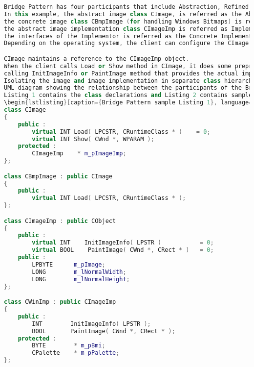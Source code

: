 \documentclass{book}
\begin{document}
\begin{lstlisting}[caption={Bridge Pattern sample code 2},label={lst:bridgepsc2},language=C++]
Bridge Pattern has four participants that include Abstraction, Refined Abstraction, Implementor and Concrete Implementor.
In this example, the abstract image class CImage, is referred as the Abstraction,
the concrete image class CBmpImage (for handling Windows Bitmaps) is referred as Refined Abstraction,
the abstract image implementation class CImageImp is referred as Implementor and the concrete class CWinImp that implements
the interfaces of the Implementor is referred as the Concrete Implementor. The application using the CImage Abstraction is the client.
Depending on the operating system, the client can configure the CImage subclass (Refined Abstraction) with a concrete CImageImp class object (Concrete Implementor).

CImage maintains a reference to the CImageImp object.
When the client calls Load or Show method in CImage, it does some preprocessing and forwards the request to CImageImp object by
calling InitImageInfo or PaintImage method that provides the actual implementation.
Isolating the image and image implementation in separate class hierarchies entitles them to vary independently.
UML diagram showing the relationship between the participants of the Bridge Pattern is presented below.
Listing 1 contains the class declarations and Listing 2 contains sample method implementations.
\begin{lstlisting}[caption={Bridge Pattern sample Listing 1}, language=C++]
class CImage
{
    public :
        virtual INT Load( LPCSTR, CRuntimeClass * )    = 0;
        virtual INT Show( CWnd *, WPARAM );
    protected :
        CImageImp    * m_pImageImp;
};

class CBmpImage : public CImage
{
    public :
        virtual INT Load( LPCSTR, CRuntimeClass * );
};

class CImageImp : public CObject
{
    public :
        virtual INT    InitImageInfo( LPSTR )           = 0;
        virtual BOOL    PaintImage( CWnd *, CRect * )   = 0;
    public :
        LPBYTE      m_pImage;
        LONG        m_lNormalWidth;
        LONG        m_lNormalHeight;
};

class CWinImp : public CImageImp
{
    public :
        INT        InitImageInfo( LPSTR );
        BOOL       PaintImage( CWnd *, CRect * );
    protected :
        BYTE        * m_pBmi;
        CPalette    * m_pPalette;
};
\end{lstlisting}
\end{document}
